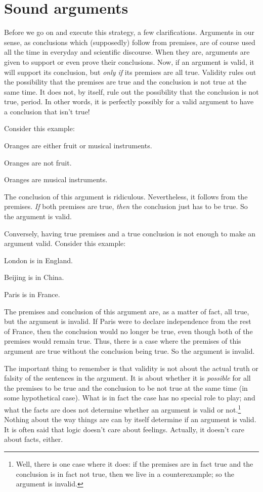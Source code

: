 \section{Sound arguments}

Before we go on and execute this strategy, a few clarifications. Arguments in our sense, as conclusions which (supposedly) follow from premises, are of course used all the time in everyday and scientific discourse. When they are, arguments are given to support or even prove their conclusions. Now, if an argument is valid, it will support its conclusion, but \emph{only if} its premises are all true. Validity rules out the possibility that the premises are true and the conclusion is not true at the same time. It does not, by itself, rule out the possibility that the conclusion is not true, period.  In other words, it is perfectly possibly for a valid argument to have a conclusion that isn't true!

Consider this example:
	\begin{earg}
		\item[] Oranges are either fruit or musical instruments.
		\item[] Oranges are not fruit.
		\item[\texttherefore] Oranges are musical instruments.
	\end{earg}
The conclusion of this argument is ridiculous. Nevertheless, it follows from the premises. \emph{If} both premises are true, \emph{then} the conclusion just has to be true. So the argument is valid.

Conversely, having true premises and a true conclusion is not enough to make an argument valid. Consider this example:
	\begin{earg}
		\item[] London is in England.
		\item[] Beijing is in China.
		\item[\texttherefore] Paris is in France.
	\end{earg}
The premises and conclusion of this argument are, as a matter of fact, all true, but the argument is invalid. If Paris were to declare independence from the rest of France, then the conclusion would no longer be true, even though both of the premises would remain true. Thus, there is a case where the premises of this argument are true without the conclusion being true. So the argument is invalid.

The important thing to remember is that validity is not about the actual truth or falsity of the sentences in the argument. It is about whether it is \emph{possible} for all the premises to be true and the conclusion to be not true at the same time (in some hypothetical case). What is in fact the case has no special role to play; and what the facts are does not determine whether an argument is valid or not.\footnote{Well, there is one case where it does: if the premises are in fact true and the conclusion is in fact not true, then we live in a counterexample; so the argument is invalid.} Nothing about the way things are can by itself determine if an argument is valid. It is often said that logic doesn't care about feelings. Actually, it doesn't care about facts, either.

